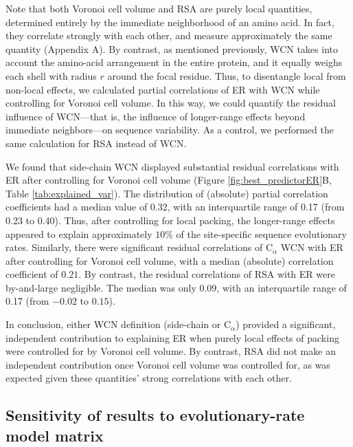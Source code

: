 \documentclass[12pt]{article}
\begin{document}
Note that both Voronoi cell volume and RSA are purely local quantities, determined entirely by the immediate neighborhood of an amino acid. In fact, they correlate strongly with each other, and measure approximately the same quantity (Appendix A). By contrast, as mentioned previously, WCN takes into account the amino-acid arrangement in the entire protein, and it equally weighs each shell with radius $r$ around the focal residue. Thus, to disentangle local from non-local effects, we calculated partial correlations of ER with WCN while controlling for Voronoi cell volume. In this way, we could quantify the residual influence of WCN---that is, the influence of longer-range effects beyond immediate neighbors---on sequence variability. As a control, we performed the same calculation for RSA instead of WCN. 

We found that side-chain WCN displayed substantial residual correlations with ER after controlling for Voronoi cell volume (Figure \ref{fig:best_predictorER}B, Table \ref{tab:explained_var}). The distribution of (absolute) partial correlation coefficients had a median value of 0.32, with an interquartile range of 0.17 (from 0.23 to 0.40). Thus, after controlling for local packing, the longer-range effects appeared to explain approximately $10\%$ of the site-specific sequence evolutionary rates. Similarly, there were significant residual correlations of C$_\alpha$ WCN with ER after controlling for Voronoi cell volume, with a median (absolute) correlation coefficient of $0.21$. By contrast, the residual correlations of RSA with ER were by-and-large negligible. The median was only $0.09$, with an interquartile range of 0.17 (from $-0.02$ to $0.15$).

In conclusion, either WCN definition (side-chain or C$_\alpha$) provided a significant, independent contribution to explaining ER when purely local effects of packing were controlled for by Voronoi cell volume. By contrast, RSA did not make an independent contribution once Voronoi cell volume was controlled for, as was expected given these quantities' strong correlations with each other.


\subsection*{Sensitivity of results to evolutionary-rate model matrix}
\end{document}
